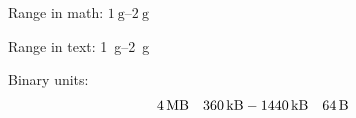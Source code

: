 \documentclass{scrartcl}
\begin{document}
  Range in math: $\SIrange{1}{2}{\gram}$
  \vspace{0.75cm}

  Range in text: \SIrange{1}{2}{\gram}
  \vspace{0.75cm}

  Binary units:
  \begin{align*}
    &\SI{4}{\mega\byte} & &\SIrange{360}{1440}{\kilo\byte} & &\SI{64}{\byte}
  \end{align*}
  \vspace{0.75cm}
\end{document}

